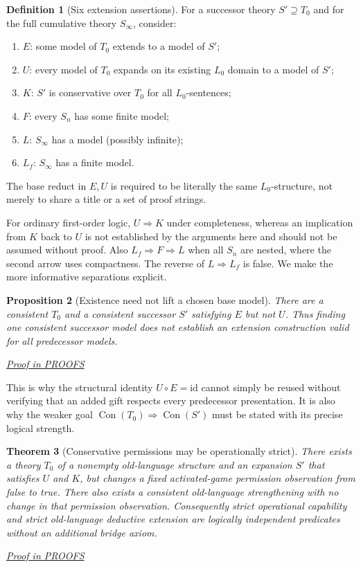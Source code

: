 \documentclass[11pt,letterpaper]{article}
\newtheorem{theorem}{Theorem}[section]
\newtheorem{proposition}[theorem]{Proposition}
\theoremstyle{definition}\newtheorem{definition}[theorem]{Definition}\newtheorem{example}[theorem]{Example}
\theoremstyle{remark}\newtheorem{remark}[theorem]{Remark}
\newcommand{\Con}{\operatorname{Con}}
\newcommand{\prooflink}[1]{\par\noindent\hfill\small\hyperref[#1]{\textit{Proof in PROOFS}}\normalsize}
\begin{document}
\begin{definition}[Six extension assertions]\label{w2:def:levels}
For a successor theory $S'\supseteq T_0$ and for the full cumulative theory $S_\infty$, consider:
\begin{enumerate}[label=\textup{(\roman*)}]
\item $E$: some model of $T_0$ extends to a model of $S'$;
\item $U$: every model of $T_0$ expands on its existing $L_0$ domain to a model of $S'$;
\item $K$: $S'$ is conservative over $T_0$ for all $L_0$-sentences;
\item $F$: every $S_n$ has some finite model;
\item $L$: $S_\infty$ has a model (possibly infinite);
\item $L_f$: $S_\infty$ has a finite model.
\end{enumerate}
The base reduct in $E,U$ is required to be literally the same $L_0$-structure, not merely to share a title or a set of proof strings.
\end{definition}

For ordinary first-order logic, $U\Rightarrow K$ under completeness, whereas an implication from $K$ back to $U$ is not established by the arguments here and should not be assumed without proof. Also $L_f\Rightarrow F\Rightarrow L$ when all $S_n$ are nested, where the second arrow uses compactness. The reverse of $L\Rightarrow L_f$ is false. We make the more informative separations explicit.

\begin{proposition}[Existence need not lift a chosen base model]\label{w2:prop:lift}
There are a consistent $T_0$ and a consistent successor $S'$ satisfying $E$ but not $U$. Thus finding one consistent successor model does not establish an extension construction valid for all predecessor models.
\prooflink{w2:pr:lift}
\end{proposition}

This is why the structural identity $U\circ E=\mathrm{id}$ cannot simply be reused without verifying that an added gift respects every predecessor presentation. It is also why the weaker goal $\Con(T_0)\Rightarrow\Con(S')$ must be stated with its precise logical strength.

\begin{theorem}[Conservative permissions may be operationally strict]\label{w2:th:independent}
There exists a theory $T_0$ of a nonempty old-language structure and an expansion $S'$ that satisfies $U$ and $K$, but changes a fixed activated-game permission observation from false to true. There also exists a consistent old-language strengthening with no change in that permission observation. Consequently strict operational capability and strict old-language deductive extension are logically independent predicates without an additional bridge axiom.
\prooflink{w2:pr:independent}
\end{theorem}
\end{document}

